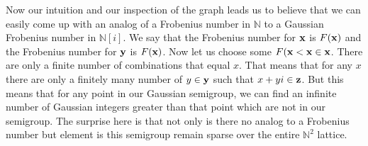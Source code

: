 \documentclass[11pt]{amsart}
\theoremstyle{plain}
\theoremstyle{definition}
\begin{document}
Now our intuition and our inspection of the graph leads us to believe that we can
easily come up with an analog of a Frobenius number in $\mathbb{N}$ to a Gaussian
Frobenius number in $\mathbb{N}[i]$. We say that the Frobenius number for $\bf{x}$
is $F(\bf{x})$ and the Frobenius number for $\bf{y}$ is $F(\bf{x})$. Now let us
choose some $F(\bf{x}<x\in \bf{x}$. There are only a finite number of combinations
that equal $x$. That means that for any $x$ there are only a finitely many number
of $y\in \bf{y}$ such that $x+yi\in \bf{z}$. But this means that for any point in
our Gaussian semigroup, we can find an infinite number of Gaussian integers greater
than that point which are not in our semigroup. The surprise here is that not only
is there no analog to a Frobenius number but element is this semigroup remain sparse
over the entire $\mathbb{N}^2$ lattice.


\end{document}
